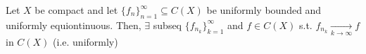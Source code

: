 \begin{thm}
    Let $X$ be compact and let $\{f_{n}\}_{n=1}^{\infty} \subseteq C(X)$
    be uniformly bounded and uniformly equiontinuous. Then, $\exists$ subseq 
    $\{f_{n_k}\}_{k=1}^{\infty} $  and $f \in C(X)$ s.t. $f_{n_k} \xrightarrow[k \to \infty]{} f$ 
    in $C(X)$ (i.e. uniformly)    
\end{thm}

